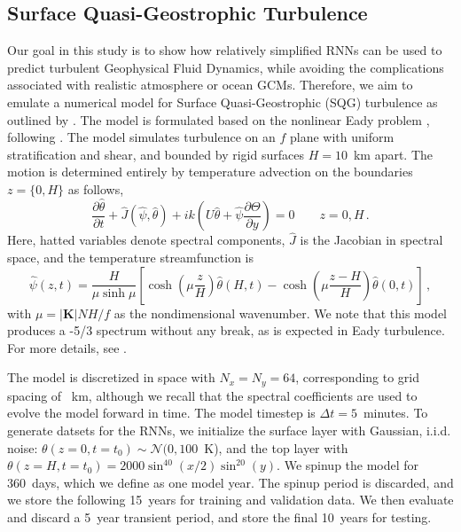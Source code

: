 \subsection{Surface Quasi-Geostrophic Turbulence}
\label{subsec:sqg}

Our goal in this study is to show how relatively simplified RNNs can be used to
predict turbulent Geophysical Fluid Dynamics, while avoiding the complications
associated with realistic atmosphere or ocean GCMs.
Therefore, we aim to emulate a numerical model for Surface Quasi-Geostrophic
(SQG) turbulence as outlined by \citet{tulloch_note_2009}.
The model is formulated based on the nonlinear Eady problem
\citep{eady_long_1949}, following \citet{blumen_uniform_1978-1}.
The model simulates turbulence
on an $f$ plane with uniform stratification and shear, and bounded by rigid
surfaces $H=10$~km apart.
The motion is determined entirely by temperature advection on the boundaries
$z=\{0,H\}$ as follows,
\begin{equation*}
    \dfrac{\partial \hat{\theta}}{\partial t} +
    \hat{J}(\hat{\psi}, \hat{\theta}) + ik\left(U \hat{\theta} +
        \hat{\psi}\dfrac{\partial \Theta}{\partial y}\right)
    = 0 \qquad z = 0, H \, .
\end{equation*}
Here, hatted variables denote spectral components, $\hat{J}$ is the Jacobian in
spectral space, and the temperature streamfunction is
\begin{equation*}
    \hat{\psi}(z,t) = \dfrac{H}{\mu\sinh\mu}
    \left[ \cosh\left(\mu\dfrac{z}{H}\right) \hat{\theta}(H,t)
        - \cosh\left(\mu\dfrac{z-H}{H}\right) \hat{\theta}(0,t)
    \right]\, ,
\end{equation*}
with $\mu = |\mathbf{K}| NH/f$ as the nondimensional wavenumber.
We note that this model produces a -5/3 spectrum without any break,
as is expected in Eady turbulence.
For more details, see \citep{tulloch_note_2009}.



The model is discretized in space with $N_x = N_y = 64$, corresponding to
grid spacing of ~km, although we recall that the spectral coefficients
are used to evolve the model forward in time.
The model timestep is $\Delta t=5$~minutes.
To generate datsets for the RNNs, we initialize the surface layer with Gaussian,
i.i.d. noise: $\theta(z=0, t=t_0) \sim \mathcal{N}(0, 100$~K), and the top layer
with $\theta(z=H, t=t_0) = 2000 \sin^{40}(x/2)\sin^{20}(y)$.
We spinup the model for 360~days, which we define as one model year.
The spinup period is discarded, and we store the following 15~years for training
and validation data.
We then evaluate and discard a 5~year transient period, and store the final
10~years for testing.
